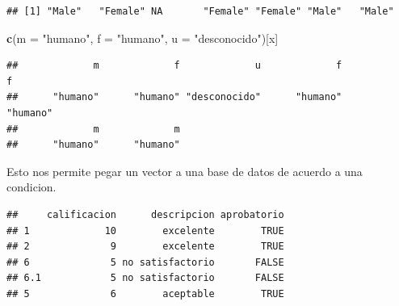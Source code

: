 \documentclass[]{article}
\newenvironment{Shaded}{\begin{snugshade}}{\end{snugshade}}
\newcommand{\KeywordTok}[1]{\textcolor[rgb]{0.13,0.29,0.53}{\textbf{{#1}}}}
\newcommand{\DataTypeTok}[1]{\textcolor[rgb]{0.13,0.29,0.53}{{#1}}}
\newcommand{\DecValTok}[1]{\textcolor[rgb]{0.00,0.00,0.81}{{#1}}}
\newcommand{\StringTok}[1]{\textcolor[rgb]{0.31,0.60,0.02}{{#1}}}
\newcommand{\NormalTok}[1]{{#1}}
\begin{document}
\begin{verbatim}
## [1] "Male"   "Female" NA       "Female" "Female" "Male"   "Male"
\end{verbatim}

\begin{Shaded}
\begin{Highlighting}[]
\KeywordTok{c}\NormalTok{(}\DataTypeTok{m =} \StringTok{"humano"}\NormalTok{, }\DataTypeTok{f =} \StringTok{"humano"}\NormalTok{, }\DataTypeTok{u =} \StringTok{"desconocido"}\NormalTok{)[x]}
\end{Highlighting}
\end{Shaded}

\begin{verbatim}
##             m             f             u             f             f 
##      "humano"      "humano" "desconocido"      "humano"      "humano" 
##             m             m 
##      "humano"      "humano"
\end{verbatim}

Esto nos permite pegar un vector a una base de datos de acuerdo a una
condicion.

\begin{Shaded}
\end{Shaded}

\begin{verbatim}
##     calificacion      descripcion aprobatorio
## 1             10        excelente        TRUE
## 2              9        excelente        TRUE
## 6              5 no satisfactorio       FALSE
## 6.1            5 no satisfactorio       FALSE
## 5              6        aceptable        TRUE
\end{verbatim}
\end{document}
